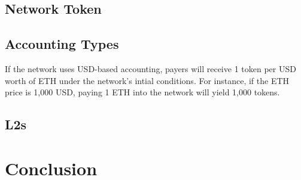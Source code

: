 \documentclass{article}
\begin{document}
\subsection{Network Token}

\subsection{Accounting Types}\label{sec:accounting_types}

If the network uses USD-based accounting, payers will receive 1 token per USD worth of ETH under the network's intial conditions. For instance, if the ETH price is 1,000 USD, paying 1 ETH into the network will yield 1,000 tokens.

\subsection{L2s}

\section{Conclusion}



\end{document}
